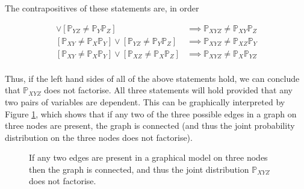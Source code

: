 \documentclass[12pt]{article}
\numberwithin{claim}{section}
\numberwithin{lemma}{section}
\numberwithin{theorem}{section}
\begin{document}
The contrapositives of these statements are, in order

\begin{align*}
[\mathbb{P}_{XZ } \neq \mathbb{P}_{X}\mathbb{P}_{Z}] \lor [\mathbb{P}_{YZ } \neq \mathbb{P}_{Y}\mathbb{P}_{Z}] & \implies \mathbb{P}_{XYZ } \neq \mathbb{P}_{XY}\mathbb{P}_{Z} \\
[\mathbb{P}_{XY } \neq \mathbb{P}_{X}\mathbb{P}_{Y}] \lor [\mathbb{P}_{YZ } \neq \mathbb{P}_{Y}\mathbb{P}_{Z}] & \implies \mathbb{P}_{XYZ } \neq \mathbb{P}_{XZ}\mathbb{P}_{Y} \\
[\mathbb{P}_{XY } \neq \mathbb{P}_{X}\mathbb{P}_{Y}] \lor [\mathbb{P}_{XZ } \neq \mathbb{P}_{X}\mathbb{P}_{Z}] & \implies \mathbb{P}_{XYZ } \neq \mathbb{P}_{X}\mathbb{P}_{YZ} \\
\end{align*}

Thus, if the left hand sides of all of the above statements hold, we can conclude that $ \mathbb{P}_{XYZ }$ does not factorise. All three statements will hold provided that any two pairs of variables are dependent. This can be graphically interpreted by Figure \ref{fig:pairwisejoint}, which shows that if any two of the three possible edges in a graph on three nodes are present, the graph is connected (and thus the joint probability distribution on the three nodes does not factorise).

\begin{figure}
\centering
\begin{subfigure}{0.3\textwidth}
\end{subfigure}%
\begin{subfigure}{0.3\textwidth}
\end{subfigure}
\begin{subfigure}{0.3\textwidth}%
\end{subfigure}
\caption{If any two edges are present in a graphical model on three nodes then the graph is connected, and thus the joint distribution $\mathbb{P}_{XYZ}$ does not factorise. \label{fig:pairwisejoint}}
\end{figure}
\end{document}
